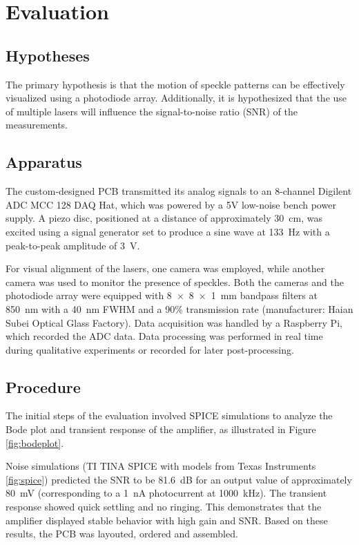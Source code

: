 \section{Evaluation}
\label{sec:evaluation}

\subsection{Hypotheses}
The primary hypothesis is that the motion of speckle patterns can be effectively visualized using a photodiode array. 
Additionally, it is hypothesized that the use of multiple lasers will influence the signal-to-noise ratio (SNR) of the measurements.

\subsection{Apparatus}

The custom-designed PCB transmitted its analog signals to an 8-channel Digilent ADC MCC 128 DAQ Hat, which was powered by a 5V low-noise bench power supply. 
A piezo disc, positioned at a distance of approximately 30~cm, was excited using a signal generator set to produce a sine wave at 133~Hz with a peak-to-peak amplitude of 3~V. 

For visual alignment of the lasers, one camera was employed, while another camera was used to monitor the presence of speckles. 
Both the cameras and the photodiode array were equipped with 8~$\times$~8~$\times$~1~mm bandpass filters at 850~nm with a 40~nm FWHM and a 90\% transmission rate (manufacturer: Haian Subei Optical Glass Factory).
Data acquisition was handled by a Raspberry Pi, which recorded the ADC data. 
Data processing was performed in real time during qualitative experiments or recorded for later post-processing.

\subsection{Procedure}

The initial steps of the evaluation involved SPICE simulations to analyze the Bode plot and transient response of the amplifier, as illustrated in Figure \ref{fig:bodeplot}.

Noise simulations (TI TINA SPICE with models from Texas Instruments \ref{fig:spice}) predicted the SNR to be 81.6~dB for an output value of approximately 80~mV (corresponding to a 1~nA photocurrent at 1000~kHz). 
The transient response showed quick settling and no ringing.
This demonstrates that the amplifier displayed stable behavior with high gain and SNR. Based on these results, the PCB was layouted, ordered and assembled.

